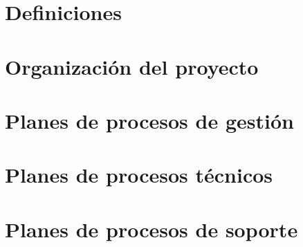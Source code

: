 \documentclass[a4paper,11pt,oneside]{report}
\begin{document}
\chapter{Definiciones}


\chapter{Organización del proyecto}


\chapter{Planes de procesos de gestión}


\chapter{Planes de procesos técnicos}


\chapter{Planes de procesos de soporte}


% 
\end{document}
